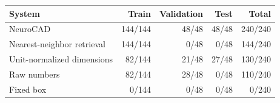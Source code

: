 \begin{tabular}{lrrrr}
\toprule
System & Train & Validation & Test & Total \\
\midrule
NeuroCAD & 144/144 & 48/48 & 48/48 & 240/240 \\
Nearest-neighbor retrieval & 144/144 & 0/48 & 0/48 & 144/240 \\
Unit-normalized dimensions & 82/144 & 21/48 & 27/48 & 130/240 \\
Raw numbers & 82/144 & 28/48 & 0/48 & 110/240 \\
Fixed box & 0/144 & 0/48 & 0/48 & 0/240 \\
\bottomrule
\end{tabular}
